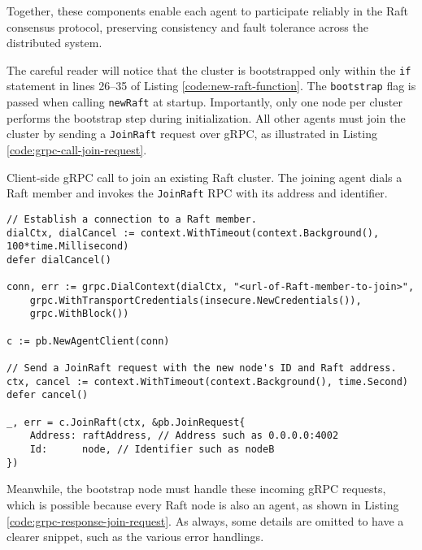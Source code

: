 Together, these components enable each agent to participate reliably in the Raft consensus protocol, preserving consistency and fault tolerance across the distributed system.

The careful reader will notice that the cluster is bootstrapped only within the \texttt{if} statement in lines 26–35 of Listing \ref{code:new-raft-function}. The \texttt{bootstrap} flag is passed when calling \texttt{newRaft} at startup. Importantly, only one node per cluster performs the bootstrap step during initialization. All other agents must join the cluster by sending a \texttt{JoinRaft} request over gRPC, as illustrated in Listing \ref{code:grpc-call-join-request}.

\begin{listing}[H]
\caption{Client-side gRPC call to join an existing Raft cluster. The joining agent dials a Raft member and invokes the \texttt{JoinRaft} RPC with its address and identifier.}
\label{code:grpc-call-join-request}
\begin{verbatim}
// Establish a connection to a Raft member.
dialCtx, dialCancel := context.WithTimeout(context.Background(), 100*time.Millisecond)
defer dialCancel()

conn, err := grpc.DialContext(dialCtx, "<url-of-Raft-member-to-join>",
    grpc.WithTransportCredentials(insecure.NewCredentials()),
    grpc.WithBlock())

c := pb.NewAgentClient(conn)

// Send a JoinRaft request with the new node's ID and Raft address.
ctx, cancel := context.WithTimeout(context.Background(), time.Second)
defer cancel()

_, err = c.JoinRaft(ctx, &pb.JoinRequest{
    Address: raftAddress, // Address such as 0.0.0.0:4002
    Id:      node, // Identifier such as nodeB
})
\end{verbatim}
\end{listing}

Meanwhile, the bootstrap node must handle these incoming gRPC requests, which is possible because every Raft node is also an agent, as shown in Listing \ref{code:grpc-response-join-request}. As always, some details are omitted to have a clearer snippet, such as the various error handlings.

